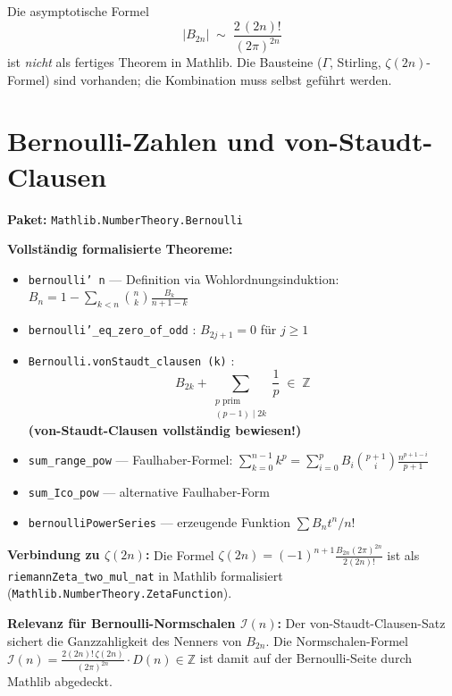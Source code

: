 \documentclass[12pt,a4paper]{article}
\newcommand{\Z}{\mathbb{Z}}
\newcommand{\Mathlib}[1]{\texttt{Mathlib.\allowbreak #1}}
\begin{document}
\begin{tcolorbox}[lücke,
  title={Fehlt: Asymptotik der Bernoulli-Zahlen via Stirling}]
Die asymptotische Formel
\[
  |B_{2n}| \;\sim\; \frac{2\,(2n)!}{(2\pi)^{2n}}
\]
ist \emph{nicht} als fertiges Theorem in Mathlib. Die Bausteine
($\Gamma$, Stirling, $\zeta(2n)$-Formel) sind vorhanden; die Kombination
muss selbst geführt werden.
\end{tcolorbox}

\section{Bernoulli-Zahlen und von-Staudt-Clausen}
\label{sec:bernoulli}

\begin{tcolorbox}[vorhanden,
  title={Formalisiert: Bernoulli-Zahlen und von-Staudt-Clausen}]
\textbf{Paket:} \Mathlib{NumberTheory.Bernoulli}

\medskip
\textbf{Vollständig formalisierte Theoreme:}

\begin{itemize}[nosep]
  \item \texttt{bernoulli' n} --- Definition via Wohlordnungsinduktion:
    $B_n = 1 - \sum_{k<n}\binom{n}{k}\frac{B_k}{n+1-k}$
  \item \texttt{bernoulli'\_eq\_zero\_of\_odd} : $B_{2j+1} = 0$ für $j \geq 1$
  \item \texttt{Bernoulli.vonStaudt\_clausen (k)} :
    \[
      B_{2k} + \sum_{\substack{p\text{ prim}\\(p-1)\mid 2k}} \frac{1}{p}
      \;\in\; \Z
    \]
    \textbf{(von-Staudt-Clausen vollständig bewiesen!)}
  \item \texttt{sum\_range\_pow} --- Faulhaber-Formel:
    $\sum_{k=0}^{n-1} k^p = \sum_{i=0}^p B_i \binom{p+1}{i}\frac{n^{p+1-i}}{p+1}$
  \item \texttt{sum\_Ico\_pow} --- alternative Faulhaber-Form
  \item \texttt{bernoulliPowerSeries} --- erzeugende Funktion $\sum B_n t^n/n!$
\end{itemize}

\medskip
\textbf{Verbindung zu $\zeta(2n)$:}
Die Formel
$\zeta(2n) = (-1)^{n+1}\frac{B_{2n}(2\pi)^{2n}}{2(2n)!}$
ist als \texttt{riemannZeta\_two\_mul\_nat} in Mathlib formalisiert
(\Mathlib{NumberTheory.ZetaFunction}).

\textbf{Relevanz für Bernoulli-Normschalen $\mathcal{I}(n)$:}
Der von-Staudt-Clausen-Satz sichert die Ganzzahligkeit des Nenners von $B_{2n}$.
Die Normschalen-Formel
$\mathcal{I}(n) = \frac{2(2n)!\,\zeta(2n)}{(2\pi)^{2n}}\cdot D(n) \in \Z$
ist damit auf der Bernoulli-Seite durch Mathlib abgedeckt.
\end{tcolorbox}
\end{document}

